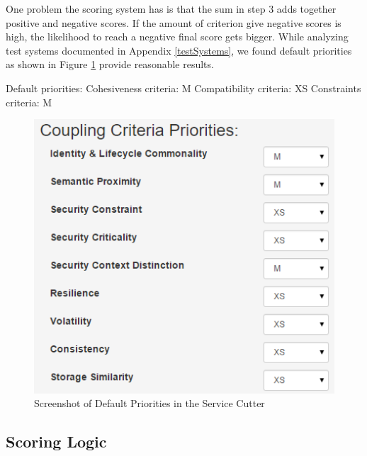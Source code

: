 \begin{minipage}[t]{0.5\textwidth}
\setlength{\parskip}{5pt plus 0.1pt}

One problem the scoring system has is that the sum in step 3 adds together positive and negative scores. If the amount of criterion give negative scores is high, the likelihood to reach a negative final score gets bigger. While analyzing test systems documented in Appendix \ref{testSystems}, we found default priorities as shown in Figure \ref{fig:priorities} provide reasonable results.


Default priorities: \newline
Cohesiveness criteria: M\newline
Compatibility criteria: XS\newline 
Constraints criteria: M\newline

\end{minipage}
\begin{minipage}[t]{0.6\textwidth}
	\begin{figure}[H]
		\begin{center}
			\includegraphics[scale=0.5]{images/priorities.png}
			\caption{Screenshot of Default Priorities in the Service Cutter}
			\label{fig:priorities}
		\end{center}
	\end{figure}
\end{minipage}

\subsection{Scoring Logic}

